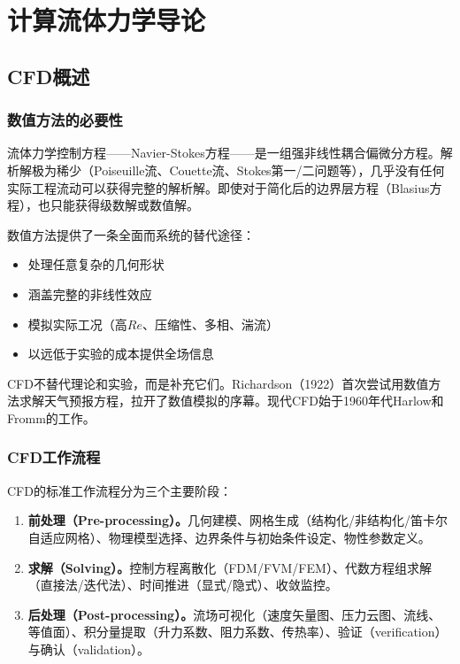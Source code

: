 \chapter{计算流体力学导论}


\section{CFD概述}

\subsection{数值方法的必要性}

流体力学控制方程——Navier-Stokes方程——是一组强非线性耦合偏微分方程。解析解极为稀少（Poiseuille流、Couette流、Stokes第一/二问题等），几乎没有任何实际工程流动可以获得完整的解析解。即使对于简化后的边界层方程（Blasius方程），也只能获得级数解或数值解。

数值方法提供了一条全面而系统的替代途径：
\begin{itemize}
  \item 处理任意复杂的几何形状
  \item 涵盖完整的非线性效应
  \item 模拟实际工况（高$Re$、压缩性、多相、湍流）
  \item 以远低于实验的成本提供全场信息
\end{itemize}

\begin{remark}
CFD不替代理论和实验，而是补充它们。Richardson（1922）首次尝试用数值方法求解天气预报方程，拉开了数值模拟的序幕。现代CFD始于1960年代Harlow和Fromm的工作。
\end{remark}

\subsection{CFD工作流程}

CFD的标准工作流程分为三个主要阶段：

\begin{enumerate}
  \item \textbf{前处理（Pre-processing）。}几何建模、网格生成（结构化/非结构化/笛卡尔自适应网格）、物理模型选择、边界条件与初始条件设定、物性参数定义。
  \item \textbf{求解（Solving）。}控制方程离散化（FDM/FVM/FEM）、代数方程组求解（直接法/迭代法）、时间推进（显式/隐式）、收敛监控。
  \item \textbf{后处理（Post-processing）。}流场可视化（速度矢量图、压力云图、流线、等值面）、积分量提取（升力系数、阻力系数、传热率）、验证（verification）与确认（validation）。
\end{enumerate}


